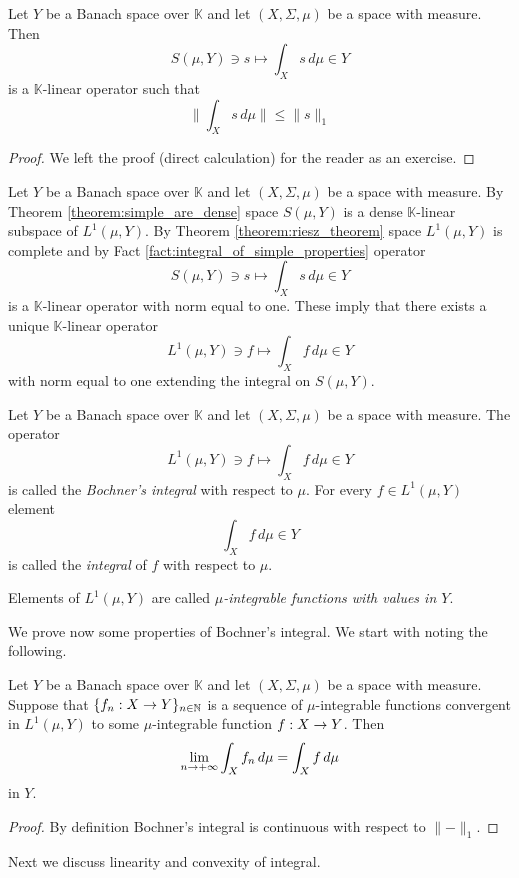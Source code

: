 \documentclass[10pt]{amsart}
\begin{document}
\begin{fact}\label{fact:integral_of_simple_properties}
	Let $Y$ be a Banach space over $\mathbb{K}$ and let $(X,\Sigma,\mu)$ be a space with measure. Then
	$$S(\mu, Y)\ni s \mapsto \int_Xs\,d\mu \in Y$$
	is a $\mathbb{K}$-linear operator such that
	$$\bigg\lVert\int_Xs\,d\mu\bigg\rVert \leq \lVert s \rVert_1$$
\end{fact}
\begin{proof}
	We left the proof (direct calculation) for the reader as an exercise.
\end{proof}
\noindent
Let $Y$ be a Banach space over $\mathbb{K}$ and let $(X,\Sigma,\mu)$ be a space with measure. By Theorem \ref{theorem:simple_are_dense} space $S(\mu, Y)$ is a dense $\mathbb{K}$-linear subspace of $L^1(\mu, Y)$. By Theorem \ref{theorem:riesz_theorem} space $L^1(\mu, Y)$ is complete and by Fact \ref{fact:integral_of_simple_properties} operator
$$S(\mu, Y)\ni s \mapsto \int_Xs\,d\mu \in Y$$
is a $\mathbb{K}$-linear operator with norm equal to one. These imply that there exists a unique $\mathbb{K}$-linear operator
$$L^1(\mu, Y)\ni f\mapsto \int_Xf\,d\mu\in Y$$
with norm equal to one extending the integral on $S(\mu, Y)$.

\begin{definition}
	Let $Y$ be a Banach space over $\mathbb{K}$ and let $(X,\Sigma,\mu)$ be a space with measure. The operator
	$$L^1(\mu, Y)\ni f\mapsto \int_Xf\,d\mu\in Y$$
is called the \textit{Bochner's integral} with respect to $\mu$. For every $f\in L^1(\mu, Y)$ element
	$$\int_Xf\,d\mu\in Y$$
is called the \textit{integral} of $f$ with respect to $\mu$.
\end{definition}

\begin{definition}
	Elements of $L^1(\mu,Y)$ are called \textit{$\mu$-integrable functions with values in $Y$}.
\end{definition}
\noindent
We prove now some properties of Bochner's integral. We start with noting the following.

\begin{corollary}\label{corollary:convergence_of_integral}
	Let $Y$ be a Banach space over $\mathbb{K}$ and let $(X,\Sigma,\mu)$ be a space with measure. Suppose that $\{f_n:X\rightarrow Y\}_{n\in {\mathbb N}}$ is a sequence of $\mu$-integrable functions convergent in $L^1(\mu, Y)$ to some $\mu$-integrable function $f:X\rightarrow Y$. Then
	$$\lim_{n\rightarrow +\infty}\int_Xf_n\,d\mu = \int_Xf\,d\mu$$
	in $Y$.
\end{corollary}
\begin{proof}
	By definition Bochner's integral is continuous with respect to $\lVert-\rVert_1$.
\end{proof}
\noindent
Next we discuss linearity and convexity of integral.
\end{document}
